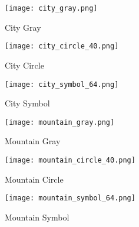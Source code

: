 \documentclass[12pt,a4paper]{article}
\begin{document}
\begin{figure}[htbp]
\centering
\begin{minipage}[t]{0.32\linewidth}
	\centering
	\texttt{[image: city\_gray.png]}
	\caption{City Gray}
\end{minipage}
\begin{minipage}[t]{0.32\linewidth}
	\centering
	\texttt{[image: city\_circle\_40.png]}
	\caption{City Circle}
\end{minipage}
\begin{minipage}[t]{0.32\linewidth}
	\centering
	\texttt{[image: city\_symbol\_64.png]}
	\caption{City Symbol}
\end{minipage}                        
\end{figure}	

\newpage
\thispagestyle{empty}	
\begin{figure}[htbp]
	\centering
	\begin{minipage}[t]{0.32\linewidth}
		\centering
		\texttt{[image: mountain\_gray.png]}
		\caption{Mountain Gray}
	\end{minipage}
	\begin{minipage}[t]{0.32\linewidth}
		\centering
		\texttt{[image: mountain\_circle\_40.png]}
		\caption{Mountain Circle}
	\end{minipage}
	\begin{minipage}[t]{0.32\linewidth}
		\centering
		\texttt{[image: mountain\_symbol\_64.png]}
		\caption{Mountain Symbol}
	\end{minipage}                        
\end{figure}		
\end{document}
